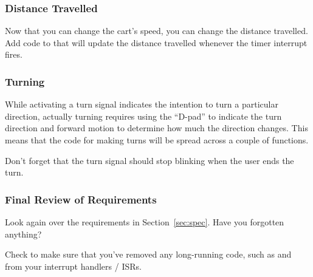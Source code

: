 \subsubsection{Distance Travelled}

Now that you can change the cart's speed, you can change the distance travelled.
Add code to  that will update the distance travelled whenever the timer interrupt fires.


\subsubsection{Turning}

While activating a turn signal indicates the intention to turn a particular direction, actually turning requires using the ``D-pad'' to indicate the turn direction and forward motion to determine how much the direction changes.
This means that the code for making turns will be spread across a couple of functions.

Don't forget that the turn signal should stop blinking when the user ends the turn.

\subsubsection{Final Review of Requirements}

Look again over the requirements in Section~\ref{sec:spec}.
Have you forgotten anything?

Check to make sure that you've removed any long-running code, such as  and  from your interrupt handlers / ISRs.
